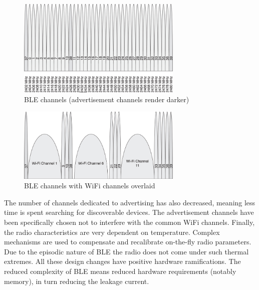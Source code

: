 \documentclass[]{article}
\begin{document}
\begin{figure}[htb]
	\begin{center}
		\includegraphics[width = 0.7\textwidth]{blechannels}
	\end{center}
	\caption{\ac{BLE} channels (advertisement channels render darker)}
	\label{fig:blechannels}
\end{figure}

\begin{figure}[htb]
	\begin{center}
		\includegraphics[width = 0.7\textwidth]{blechannelswifi}
	\end{center}
	\caption{\ac{BLE} channels with WiFi channels overlaid}
	\label{fig:blechannelswifi}
\end{figure}


The number of channels dedicated to advertising has also decreased, meaning less time is spent searching for discoverable devices. The advertisement channels have been specifically chosen not to interfere with the common WiFi channels. Finally, the radio characteristics are very dependent on temperature. Complex mechanisms are used to compensate and recalibrate on-the-fly radio parameters. Due to the episodic nature of \ac{BLE} the radio does not come under such thermal extremes. All these design changes have positive hardware ramifications. The reduced complexity of \ac{BLE} means reduced hardware requirements (notably memory), in turn reducing the leakage current. 
\end{document}

